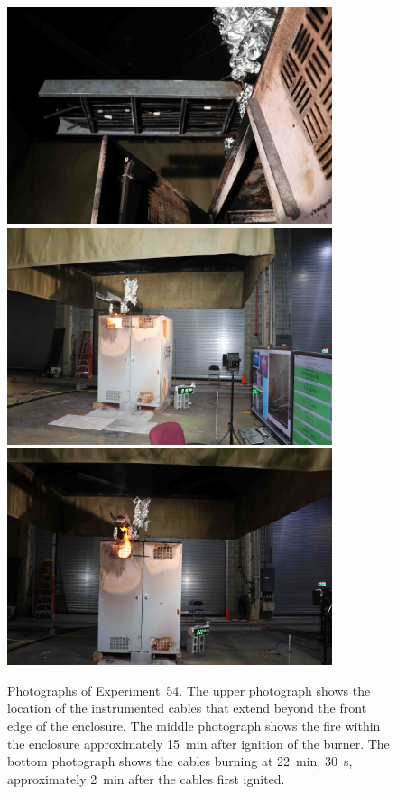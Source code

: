 \begin{figure}[p]
\centering
\includegraphics[height=2.50in]{../FIGURES/Test_54_cables} \\
\includegraphics[height=2.50in]{../FIGURES/Test_54_15_min_20_s} \\
\includegraphics[height=2.50in]{../FIGURES/Test_54_22_min_31_s}
\caption[Photographs of Experiment~54]{Photographs of Experiment~54. The upper photograph shows the location of the instrumented cables that extend beyond the front edge of the enclosure. The middle photograph shows the fire within the enclosure approximately 15~min after ignition of the burner. The bottom photograph shows the cables burning at 22~min, 30~s, approximately 2~min after the cables first ignited.}
\label{fig:Test_54_photos}
\end{figure}


